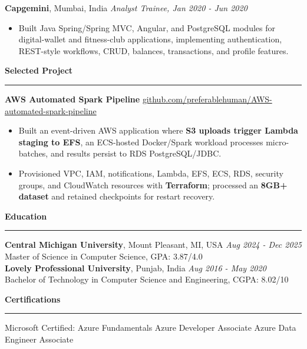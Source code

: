 \documentclass[11pt,letterpaper]{article}
\newcommand{\ressection}[1]{\Needspace{6\baselineskip}\vspace{8pt}\par\textbf{#1}\par\vspace{2pt}\hrule\vspace{5pt}}
\begin{document}
\textbf{Capgemini}, Mumbai, India \hfill \textit{Analyst Trainee, Jan 2020 - Jun 2020}
\begin{itemize}
  \item Built Java Spring/Spring MVC, Angular, and PostgreSQL modules for digital-wallet and fitness-club applications, implementing authentication, REST-style workflows, CRUD, balances, transactions, and profile features.
\end{itemize}

\ressection{Selected Project}
\textbf{AWS Automated Spark Pipeline} \hfill \href{https://github.com/preferablehuman/AWS-automated-spark-pipeline}{github.com/preferablehuman/AWS-automated-spark-pipeline}
\begin{itemize}
  \item Built an event-driven AWS application where \textbf{S3 uploads trigger Lambda staging to EFS}, an ECS-hosted Docker/Spark workload processes micro-batches, and results persist to RDS PostgreSQL/JDBC.
  \item Provisioned VPC, IAM, notifications, Lambda, EFS, ECS, RDS, security groups, and CloudWatch resources with \textbf{Terraform}; processed an \textbf{8GB+ dataset} and retained checkpoints for restart recovery.
\end{itemize}

\ressection{Education}
\textbf{Central Michigan University}, Mount Pleasant, MI, USA \hfill \textit{Aug 2024 - Dec 2025}\\
Master of Science in Computer Science, GPA: 3.87/4.0\\[2pt]
\textbf{Lovely Professional University}, Punjab, India \hfill \textit{Aug 2016 - May 2020}\\
Bachelor of Technology in Computer Science and Engineering, CGPA: 8.02/10

\ressection{Certifications}
Microsoft Certified: Azure Fundamentals \textbar{} Azure Developer Associate \textbar{} Azure Data Engineer Associate
\end{document}
